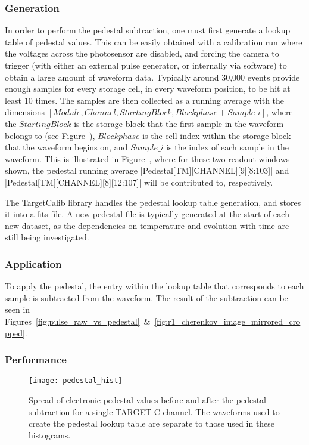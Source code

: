 \subsubsection{Generation}

In order to perform the pedestal subtraction, one must first generate a lookup table of pedestal values. This can be easily obtained with a calibration run where the voltages across the photosensor are disabled, and forcing the camera to trigger (with either an external pulse generator, or internally via software) to obtain a large amount of waveform data. Typically around 30,000 events provide enough samples for every storage cell, in every waveform position, to be hit at least 10 times. The samples are then collected as a running average with the dimensions $[Module, Channel, Starting Block, Blockphase+Sample\_i]$, where the $Starting Block$ is the storage block that the first sample in the waveform belongs to (see Figure~), $Blockphase$ is the cell index within the storage block that the waveform begins on, and $Sample\_i$ is the index of each sample in the waveform. This is illustrated in Figure~, where for these two readout windows shown, the pedestal running average |Pedestal[TM][CHANNEL][9][8:103]| and |Pedestal[TM][CHANNEL][8][12:107]| will be contributed to, respectively.

The TargetCalib library handles the pedestal lookup table generation, and stores it into a \gls{fits} file. A new pedestal file is typically generated at the start of each new dataset, as the dependencies on temperature and evolution with time are still being investigated.

\subsubsection{Application}

To apply the pedestal, the entry within the lookup table that corresponds to each sample is subtracted from the waveform. The result of the subtraction can be seen in Figures~\ref{fig:pulse_raw_vs_pedestal}~\&~\ref{fig:r1_cherenkov_image_mirrored_cropped}. 

\subsubsection{Performance}

\begin{figure}
	\centering
    \texttt{[image: pedestal\_hist]} 
	\caption[Spread of electronic-pedestal values before and after the pedestal subtraction.]{Spread of electronic-pedestal values before and after the pedestal subtraction for a single TARGET-C channel. The waveforms used to create the pedestal lookup table are separate to those used in these histograms.} 
	\label{fig:pedestalresiduals}
\end{figure}

